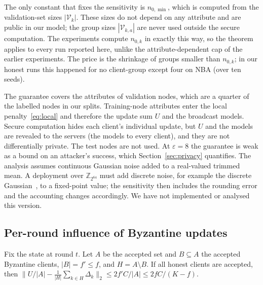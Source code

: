 \begin{remark}
The only constant that fixes the sensitivity is $n_{0,\min}$, which is computed from the validation-set sizes $|\mathcal{V}_k|$. These sizes do not depend on any attribute and are public in our model; the group sizes $|\mathcal{V}_{k,a}|$ are never used outside the secure computation. The experiments compute $n_{0,k}$ in exactly this way, so the theorem applies to every run reported here, unlike the attribute-dependent cap of the earlier experiments. The price is the shrinkage of groups smaller than $n_{0,k}$; in our honest runs this happened for no client-group except four on NBA (over ten seeds).
\end{remark}

\begin{remark}[Scope]
The guarantee covers the attributes of validation nodes, which are a quarter of the labelled nodes in our splits. Training-node attributes enter the local penalty~\eqref{eq:local} and therefore the update sum $U$ and the broadcast models. Secure computation hides each client's individual update, but $U$ and the models are revealed to the servers (the models to every client), and they are not differentially private. The test nodes are not used. At $\varepsilon=8$ the guarantee is weak as a bound on an attacker's success, which Section~\ref{sec:privacy} quantifies. The analysis assumes continuous Gaussian noise added to a real-valued trimmed mean. A deployment over $\mathbb{Z}_{2^{64}}$ must add discrete noise, for example the discrete Gaussian~\citep{canonne2020discrete,kairouz2021distributed}, to a fixed-point value; the sensitivity then includes the rounding error and the accounting changes accordingly. We have not implemented or analysed this version.
\end{remark}

\subsection{Per-round influence of Byzantine updates}

\begin{theorem}\label{thm:update}
Fix the state at round $t$. Let $A$ be the accepted set and $B\subseteq A$ the accepted Byzantine clients, $|B|=f'\le f$, and $H=A\setminus B$. If all honest clients are accepted, then $\bigl\|U/|A|-\frac{1}{|H|}\sum_{k\in H}\Delta_k\bigr\|_2\le 2f'C/|A|\le2fC/(K-f)$.
\end{theorem}

